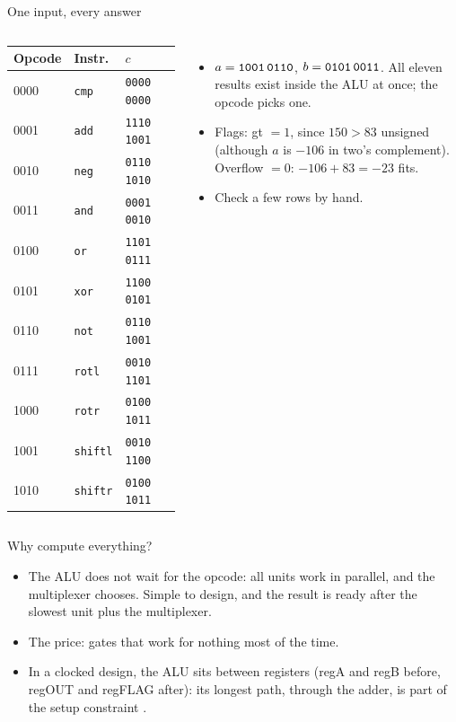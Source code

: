 \documentclass[10pt]{wosm-slides}
\newcommand*\byte[2]{\texttt{#1\,#2}}
\begin{document}
\begin{frame}{One input, every answer}
  \begin{columns}[c, totalwidth=\textwidth]
      \centering
      \small
      \begin{tabular}{@{}lll@{}}
        \toprule
        Opcode & Instr. & $c$ \\
        \midrule
        0000 & \texttt{cmp}    & \byte{0000}{0000} \\
        0001 & \texttt{add}    & \byte{1110}{1001} \\
        0010 & \texttt{neg}    & \byte{0110}{1010} \\
        0011 & \texttt{and}    & \byte{0001}{0010} \\
        0100 & \texttt{or}     & \byte{1101}{0111} \\
        0101 & \texttt{xor}    & \byte{1100}{0101} \\
        0110 & \texttt{not}    & \byte{0110}{1001} \\
        0111 & \texttt{rotl}   & \byte{0010}{1101} \\
        1000 & \texttt{rotr}   & \byte{0100}{1011} \\
        1001 & \texttt{shiftl} & \byte{0010}{1100} \\
        1010 & \texttt{shiftr} & \byte{0100}{1011} \\
        \bottomrule
      \end{tabular}
      \begin{itemize}
        \item $a = \byte{1001}{0110}$, $b = \byte{0101}{0011}$. All eleven results
          exist inside the ALU at once; the opcode picks one.
        \item Flags: gt $= 1$, since $150 > 83$ unsigned (although $a$ is $-106$ in
          two's complement). Overflow $= 0$: $-106 + 83 = -23$ fits.
        \item Check a few rows by hand.
      \end{itemize}
  \end{columns}
\end{frame}

\begin{frame}{Why compute everything?}
  \begin{itemize}
    \item The ALU does not wait for the opcode: all units work in parallel, and the
      multiplexer chooses. Simple to design, and the result is ready after the
      slowest unit plus the multiplexer.
    \item The price: gates that work for nothing most of the time.
    \item In a clocked design, the ALU sits between registers (regA and regB before,
      regOUT and regFLAG after): its longest path, through the adder, is part of the
      setup constraint .
  \end{itemize}
\end{frame}
\end{document}
